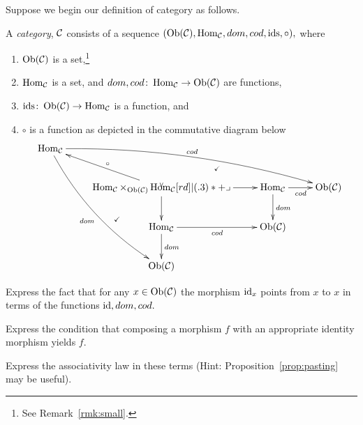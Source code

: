 \documentclass[../main/CT4S-EN-RU]{subfiles}
\begin{document}
\begin{exerciseENG}\label{exc:cat in set}
Suppose we begin our definition of category as follows. 

A {\em category}, $\mathcal{C}$ consists of a sequence $(\operatorname{Ob}(\mathcal{C}),\operatorname{Hom}_\mathcal{C},dom,cod,\operatorname{ids},\circ),$ where 
\begin{enumerate}
\item $\operatorname{Ob}(\mathcal{C})$ is a set,\footnote{See Remark~\ref{rmk:small}.}
\item $\operatorname{Hom}_\mathcal{C}$ is a set, and $dom,cod\colon\operatorname{Hom}_\mathcal{C}\rightarrow\operatorname{Ob}(\mathcal{C})$ are functions, 
\item $\operatorname{ids}\colon\operatorname{Ob}(\mathcal{C})\rightarrow\operatorname{Hom}_\mathcal{C}$ is a function, and 
\item $\circ$ is a function as depicted in the commutative diagram below
\begin{align}\label{dia:pullback version of cat}
\xymatrix{
\Hom_\mcC\ar@/^1pc/[drrr]^{cod}\ar@/_1pc/[dddr]_{dom}&&\\
&\Hom_\mcC\times_{\Ob(\mcC)}\Hom_\mcC\ar@{}[ur]|{\checkmark}\ar@{}[ddl]|(.4){\checkmark}\ar[ul]_\circ\ar[r]\ar[d]\ullimit&\Hom_\mcC\ar[r]_{cod}\ar[d]^{dom}&\Ob(\mcC)\\
&\Hom_\mcC\ar[r]_{cod}\ar[d]^{dom}&\Ob(\mcC)\\
&\Ob(\mcC)
}
\end{align}
\end{enumerate}

\sexc Express the fact that for any $x\in\operatorname{Ob}(\mathcal{C})$ the morphism $\operatorname{id}_x$ points from $x$ to $x$ in terms of the functions $\operatorname{id},dom,cod.$ 
\item Express the condition that composing a morphism $f$ with an appropriate identity morphism yields $f.$
\item Express the associativity law in these terms (Hint: Proposition~\ref{prop:pasting} may be useful).
\endsexc
\end{exerciseENG}

\begin{exerciseRUS}\label{exc:cat in set}
\end{exerciseRUS}
\end{document}
